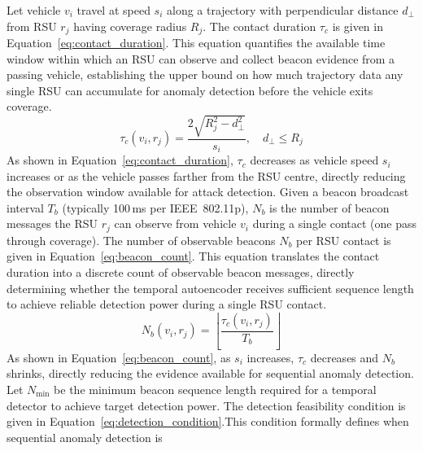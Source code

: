 \documentclass[12pt, a4paper]{report}
\begin{document}
Let vehicle $v_i$ travel at speed $s_i$ along a trajectory with perpendicular
distance $d_{\perp}$ from RSU $r_j$ having coverage radius $R_j$. The contact
duration $\tau_c$ is given in Equation~\ref{eq:contact_duration}.
\newline
\newline
This equation quantifies the available time window within which an RSU
can observe and collect beacon evidence from a passing vehicle,
establishing the upper bound on how much trajectory data any single
RSU can accumulate for anomaly detection before the vehicle exits coverage.
\begin{equation}
  \tau_c(v_i, r_j) = \frac{2\sqrt{R_j^2 - d_{\perp}^2}}{s_i},
  \quad d_{\perp} \leq R_j
  \label{eq:contact_duration}
\end{equation}
As shown in Equation~\ref{eq:contact_duration}, $\tau_c$ decreases as vehicle
speed $s_i$ increases or as the vehicle passes farther from the RSU centre,
directly reducing the observation window available for attack detection.
\newline
\newline
Given a beacon broadcast interval $T_b$ (typically 100\,ms per IEEE~802.11p),
$N_b$ is the number of beacon messages the RSU $r_j$ can observe from vehicle
$v_i$ during a single contact (one pass through coverage). The number of
observable beacons $N_b$ per RSU contact is given in Equation~\ref{eq:beacon_count}.
\newline
\newline
This equation translates the contact duration into a discrete count of
observable beacon messages, directly determining whether the temporal
autoencoder receives sufficient sequence length to achieve reliable
detection power during a single RSU contact.
\begin{equation}
  N_b(v_i, r_j) = \left\lfloor \frac{\tau_c(v_i, r_j)}{T_b} \right\rfloor
  \label{eq:beacon_count}
\end{equation}
\newline
\newline
As shown in Equation~\ref{eq:beacon_count}, as $s_i$ increases, $\tau_c$
decreases and $N_b$ shrinks, directly reducing the evidence available for
sequential anomaly detection. Let $N_{\min}$ be the minimum beacon sequence
length required for a temporal detector to achieve target detection power.
\newline
\newline
The detection feasibility condition is given in Equation~\ref{eq:detection_condition}.This condition formally defines when sequential anomaly detection is
\end{document}
